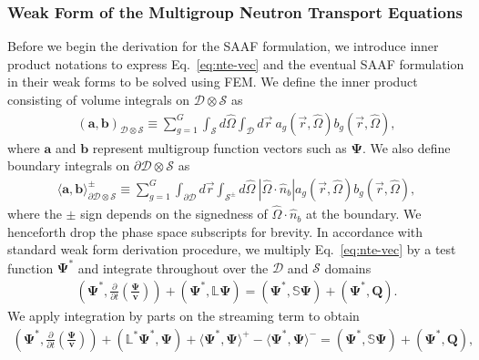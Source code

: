 \subsubsection{Weak Form of the Multigroup Neutron Transport Equations}

Before we begin the derivation for the \gls{SAAF} formulation, we introduce inner product notations
to express Eq.\ \ref{eq:nte-vec} and the eventual \gls{SAAF} formulation in their weak forms to be
solved using \gls{FEM}. We define the inner product consisting of volume integrals on
$\mathcal{D}\otimes\mathcal{S}$ as
%
\begin{gather}
  (\bm{a}, \bm{b})_{\mathcal{D}\otimes\mathcal{S}} \equiv
  \sum^G_{g=1}\int_\mathcal{S}d\hat{\Omega}\int_\mathcal{D}d\vec{r}\
  a_g(\vec{r},\hat{\Omega}) b_g(\vec{r},\hat{\Omega}), \label{eq:weak-domain}
\end{gather}
%
where $\bm{a}$ and $\bm{b}$ represent multigroup function vectors such as $\bm{\Psi}$. We also
define boundary integrals on $\partial\mathcal{D}\otimes\mathcal{S}$ as
%
\begin{gather}
  \langle\bm{a},\bm{b}\rangle^\pm_{\partial\mathcal{D}\otimes\mathcal{S}} \equiv
  \sum^G_{g=1}\int_{\partial\mathcal{D}}d\vec{r}
  \int_{\mathcal{S}^{\pm}}d\hat{\Omega}\ |\hat{\Omega}\cdot\hat{n}_b|
  a_g(\vec{r},\hat{\Omega}) b_g(\vec{r},\hat{\Omega}), \label{eq:weak-boundary}
\end{gather}
%
where the $\pm$ sign depends on the signedness of $\hat{\Omega}\cdot\hat{n}_b$ at the boundary.
We henceforth drop the phase space subscripts for brevity.
%
In accordance with standard weak form derivation procedure, we multiply Eq.\ \ref{eq:nte-vec}
by a test function $\bm{\Psi}^*$ and integrate throughout over the $\mathcal{D}$ and $\mathcal{S}$
domains
%
\begin{gather}
  \left(\bm{\Psi}^*,\frac{\partial}{\partial t}\left(\frac{\bm{\Psi}}{\bm{v}}\right)\right) +
  \left(\bm{\Psi}^*,\mathbb{L}\bm{\Psi}\right) = \left(\bm{\Psi}^*,\mathbb{S}\bm{\Psi}\right) +
  \left(\bm{\Psi}^*,\bm{Q}\right).
\end{gather}
%
We apply integration by parts on the streaming term to obtain
%
\begin{gather}
  \left(\bm{\Psi}^*,\frac{\partial}{\partial t}\left(\frac{\bm{\Psi}}{\bm{v}}\right)\right) +
  \left(\mathbb{L}^*\bm{\Psi}^*,\bm{\Psi}\right) + \langle\bm{\Psi}^*,\bm{\Psi}\rangle^+ -
  \langle\bm{\Psi}^*,\bm{\Psi}\rangle^- = \left(\bm{\Psi}^*,\mathbb{S}\bm{\Psi}\right) +
  \left(\bm{\Psi}^*,\bm{Q}\right), \label{eq:nte-weak}
\end{gather}
